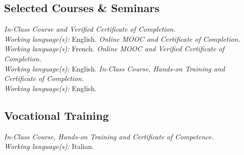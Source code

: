 \documentclass[
  a4paper, 
]{fortysecondscv}
\begin{document}
\subsection{Selected Courses \& Seminars}
\begin{cvtable}
		{{\small\emph{\small In-Class Course and Verified Certificate of Completion.}\\\textit{\small Working language(s):} English.}}
		{{\small\emph{\small Online MOOC and Certificate of Completion.}\\\textit{\small Working language(s):} French.}}
		{{\small\emph{\small Online MOOC and Verified Certificate of Completion.}\\\textit{\small Working language(s):} English.}}
		{{\small\emph{\small In-Class Course, Hands-on Training and Certificate of Completion.}\\\textit{\small Working language(s):} English.}}
\end{cvtable}
\subsection{Vocational Training}
\begin{cvtable}
		{{\small\emph{\small In-Class Course, Hands-on Training and Certificate of Competence.}\\\textit{\small Working language(s):} Italian.}}
\end{cvtable}

\begin{cvtable}
	
\end{cvtable}

\newpage
\makebacksidebar
\end{document}
